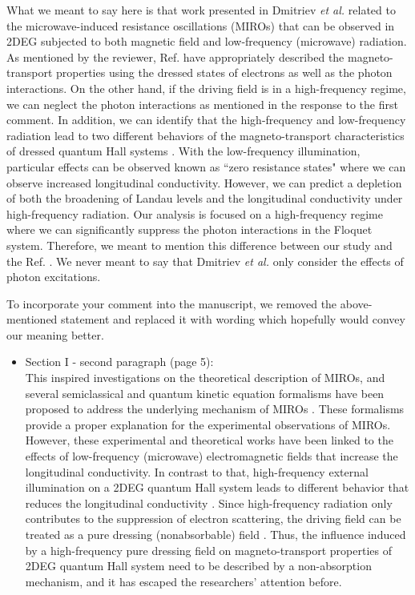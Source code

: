 \documentclass{article}
\begin{document}
What we meant to say here is that work presented in Dmitriev \textit{et al.} \cite{dmitriev09} related to the microwave-induced resistance oscillations (MIROs) that can be observed in 2DEG subjected to both magnetic field and low-frequency (microwave) radiation. As mentioned by the reviewer, Ref. \cite{dmitriev09} have appropriately described the magneto-transport properties using the dressed states of electrons as well as the photon interactions. On the other hand, if the driving field is in a high-frequency regime, we can neglect the photon interactions as mentioned in the response to the first comment. In addition, we can identify that the high-frequency and low-frequency radiation lead to two different behaviors of the magneto-transport characteristics of dressed quantum Hall systems \cite{dini16}. With the low-frequency illumination, particular effects can be observed known as ``zero resistance states" where we can observe increased longitudinal conductivity. However, we can predict a depletion of both the broadening of Landau levels and the longitudinal conductivity under high-frequency radiation.
Our analysis is focused on a high-frequency regime where we can significantly suppress the photon interactions in the Floquet system. Therefore, we meant to mention this difference between our study and the Ref. \cite{dmitriev09}. We never meant to say that Dmitriev \textit{et al.} \cite{dmitriev09} only consider the effects of photon excitations.

To incorporate your comment into the manuscript, we removed the above-mentioned statement and replaced it with wording which hopefully would convey our meaning better.

\begin{itemize}
  \item Section I - second paragraph (page 5):\\
  {\color{Red}
  This inspired investigations on the theoretical description of MIROs, and several semiclassical and quantum kinetic equation formalisms have been proposed to address the underlying mechanism of MIROs \cite{durst03,dmitriev03,dmitriev05,dmitriev09}. These formalisms provide a proper explanation for the experimental observations of MIROs. However, these experimental and theoretical works have been linked to the effects of low-frequency (microwave) electromagnetic fields that increase the longitudinal conductivity.
  In contrast to that, high-frequency external illumination on a 2DEG quantum Hall system leads to different behavior that reduces the longitudinal conductivity \cite{dini16}.
  Since high-frequency radiation only contributes to the suppression of electron scattering, the driving field can be treated as a pure dressing (nonabsorbable) field \cite{dini16}.
  Thus, the influence induced by a high-frequency pure dressing field on
  magneto-transport properties of 2DEG quantum Hall system need to be described by a non-absorption mechanism, and it has escaped the researchers’ attention before.
  }
\end{itemize}
\end{document}
